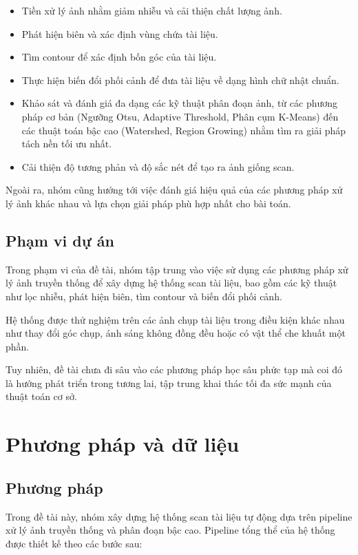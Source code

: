 \documentclass[12pt, a4paper]{report}
\begin{document}
\begin{itemize}
    \item Tiền xử lý ảnh nhằm giảm nhiễu và cải thiện chất lượng ảnh.
    \item Phát hiện biên và xác định vùng chứa tài liệu.
    \item Tìm contour để xác định bốn góc của tài liệu.
    \item Thực hiện biến đổi phối cảnh để đưa tài liệu về dạng hình chữ nhật chuẩn.
    \item Khảo sát và đánh giá đa dạng các kỹ thuật phân đoạn ảnh, từ các phương pháp cơ bản (Ngưỡng Otsu, Adaptive Threshold, Phân cụm K-Means) đến các thuật toán bậc cao (Watershed, Region Growing) nhằm tìm ra giải pháp tách nền tối ưu nhất.
    \item Cải thiện độ tương phản và độ sắc nét để tạo ra ảnh giống scan.
\end{itemize}

Ngoài ra, nhóm cũng hướng tới việc đánh giá hiệu quả của các phương pháp xử lý ảnh khác nhau và lựa chọn giải pháp phù hợp nhất cho bài toán.

\section{Phạm vi dự án}

Trong phạm vi của đề tài, nhóm tập trung vào việc sử dụng các phương pháp xử lý ảnh truyền thống để xây dựng hệ thống scan tài liệu, bao gồm các kỹ thuật như lọc nhiễu, phát hiện biên, tìm contour và biến đổi phối cảnh.

Hệ thống được thử nghiệm trên các ảnh chụp tài liệu trong điều kiện khác nhau như thay đổi góc chụp, ánh sáng không đồng đều hoặc có vật thể che khuất một phần.

Tuy nhiên, đề tài chưa đi sâu vào các phương pháp học sâu phức tạp mà coi đó là hướng phát triển trong tương lai, tập trung khai thác tối đa sức mạnh của thuật toán cơ sở.

\chapter{Phương pháp và dữ liệu}

\section{Phương pháp}

Trong đề tài này, nhóm xây dựng hệ thống scan tài liệu tự động dựa trên pipeline xử lý ảnh truyền thống và phân đoạn bậc cao. Pipeline tổng thể của hệ thống được thiết kế theo các bước sau:
\end{document}
